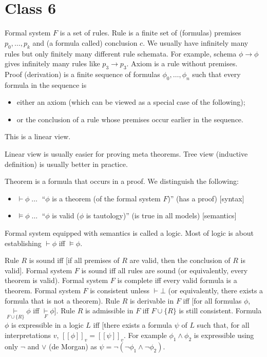 {{%

\chapter{Class 6}

Formal system $F$ is a set of rules.
Rule is a finite set of (formulas) premises $p_0, \dots, p_k$ and (a formula called) conclusion $c$.
We usually have infinitely many rules but only finitely many different rule schemata.
For example, schema $\phi \rightarrow \phi$ gives infinitely many rules like $p_3 \rightarrow p_3$.
Axiom is a rule without premises.\bigskip\\
Proof (derivation) is a finite sequence of formulas $\phi_0, \dots, \phi_n$ such that every formula in the sequence is
\begin{itemize}
\item either an axiom (which can be viewed as a special case of the following);
\item or the conclusion of a rule whose premises occur earlier in the sequence.
\end{itemize}
This is a linear view.

Linear view is usually easier for proving meta theorems.
Tree view (inductive definition) is usually better in practice.

Theorem is a formula that occurs in a proof. We distinguish the following:
\begin{itemize}
\item $\vdash \phi \;\dots\;$ ``$\phi$ is a theorem (of the formal system $F$)'' (has a proof) [syntax]
\item $\vDash \phi \;\dots\;$ ``$\phi$ is valid ($\phi$ is tautology)'' (is true in all models) [semantics]
\end{itemize}
Formal system equipped with semantics is called a logic.
Most of logic is about establishing $\vdash \phi$ iff $\vDash \phi$.

Rule $R$ is sound iff [if all premises of $R$ are valid, then the conclusion of $R$ is valid].
Formal system $F$ is sound iff all rules are sound (or equivalently, every theorem is valid).
Formal system $F$ is complete iff every valid formula is a theorem.
Formal system $F$ is consistent unless $\vdash \bot$ (or equivalently, there exists a formula that is not a theorem).
Rule $R$ is derivable in $F$ iff [for all formulas $\phi$, $\underset{F \cup \{R\}}\vdash \phi$ iff $\underset{F}\vdash \phi$].
Rule $R$ is admissible in $F$ iff $F \cup \{R\}$ is still consistent.
Formula $\phi$ is expressible in a logic $L$ iff [there exists a formula $\psi$ of $L$ such that, for all interpretations $v$, $[[ \phi ]]_v = [[ \psi ]]_v$.
For example $\phi_1 \wedge \phi_2$ is expressible using only $\neg$ and $\vee$ (de Morgan)
as $\psi = \neg(\neg\phi_1 \wedge \neg\phi_2)$.

}}
